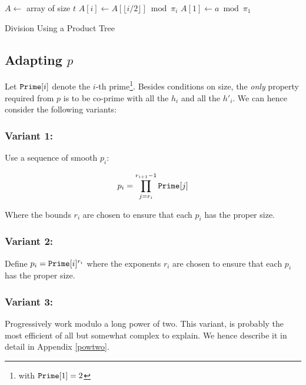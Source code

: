 \documentclass[11pt]{llncs}
\begin{document}
\newpage

\begin{algorithm}
\newcommand{\vstart}{\ensuremath{\mathrm{start}}}
\newcommand{\vmid}{\ensuremath{\mathrm{mid}}}
\newcommand{\vend}{\ensuremath{\mathrm{end}}}
\begin{algorithmic}[1]
\State $A \gets $ array of size $t$
    \State $A[i] \gets A[\lfloor i/2 \rfloor] \bmod \pi_i$
    \State {}
    \State {}
  \EndIf
\EndFunction
\State $A[1] \gets a \bmod \pi_1$
\State {}
\State {}
\end{algorithmic}
\caption{Division Using a Product Tree}\label{alg:div-prod-tree}
\end{algorithm}

\subsection{Adapting $p$}

Let $\mbox{{\tt Prime}}[i]$ denote the $i$-th prime\footnote{with $\mbox{{\tt Prime}}[1]=2$}. Besides conditions on size, the {\sl only} property required from $p$ is to be co-prime with all the $h_i$ and all the $h'_i$. We can hence consider the following variants:

\subsubsection{Variant 1:} Use a sequence of smooth $p_i$:

$$p_i=\prod_{j=r_i}^{r_{i+1}-1} \mbox{{\tt Prime}}[j]$$

Where the bounds $r_i$ are chosen to ensure that each $p_i$ has the proper size.

\subsubsection{Variant 2:} Define $p_i=\mbox{{\tt Prime}}[i]^{r_i}$ where the exponents $r_i$ are chosen to ensure that each $p_i$ has the proper size.

\subsubsection{Variant 3:} Progressively work modulo a long power of two. This variant, is probably the most efficient of all but somewhat complex to explain. We hence describe it in detail in Appendix \ref{powtwo}.
\end{document}
